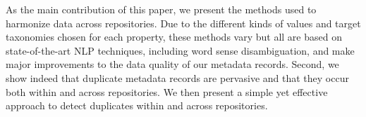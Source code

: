 \documentclass[11pt]{article}
\begin{document}



As the main contribution of this paper, we present the methods used to harmonize
data across repositories. Due to the different kinds of values and target
taxonomies chosen for each property, these methods vary but all are based on
state-of-the-art NLP techniques, including word sense disambiguation, and make
major improvements to the data quality of our metadata records.
Second, we show indeed that duplicate metadata records are pervasive and that
they occur both within and across repositories. We then present a simple yet
effective approach to detect duplicates within and across repositories. 
\end{document}
